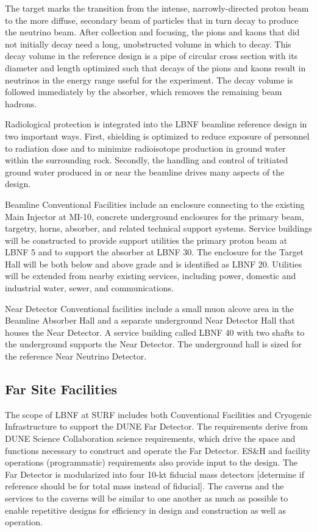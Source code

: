 The target marks the transition from the intense, narrowly-directed proton beam to the more diffuse, secondary beam of particles that in turn decay to produce the neutrino beam. After collection and focusing, the pions and kaons that did not initially decay need a long, unobstructed volume in which to decay. This decay volume in the reference design is a pipe of circular cross section with its diameter and length optimized such that decays of the pions and kaons result in neutrinos in the energy range useful for the experiment. The decay volume is followed immediately by the absorber, which removes the remaining beam hadrons. 

Radiological protection is integrated into the LBNF beamline reference design in two important ways. First, shielding is optimized to reduce exposure of personnel to radiation dose and to minimize radioisotope production in ground water within the surrounding rock. Secondly, the handling and control of tritiated ground water produced in or near the beamline drives many aspects of the design. 

Beamline Conventional Facilities include an enclosure connecting to the existing Main Injector at MI-10, concrete underground enclosures for the primary beam, targetry, horns, absorber, and related technical support systems. Service buildings will be constructed to provide support utilities the primary proton beam at LBNF 5 and to support the absorber at LBNF 30. The enclosure for the Target Hall will be both below and above grade and is identified as LBNF 20.  Utilities will be extended from nearby existing services, including power, domestic and industrial water, sewer, and communications. 

Near Detector Conventional facilities include a small muon alcove area in the Beamline Absorber Hall and a separate underground Near Detector Hall that houses the Near Detector. A service building called LBNF 40 with two shafts to the underground supports the Near Detector. The underground hall is sized for the reference Near Neutrino Detector.

\subsection{Far Site Facilities}

The scope of LBNF at SURF includes both Conventional Facilities and Cryogenic Infrastructure to support the DUNE Far Detector. The requirements derive from DUNE Science Collaboration science requirements, which drive the space and functions necessary to construct and operate the Far Detector.  ES\&H and facility operations (programmatic) requirements also provide input to the design. The Far Detector is modularized into four 10-kt fiducial mass detectors [determine if reference should be for total mass instead of fiducial]. The caverns and the services to the caverns will be similar to one another as much as possible to enable repetitive designs for efficiency in design and construction as well as operation. 

